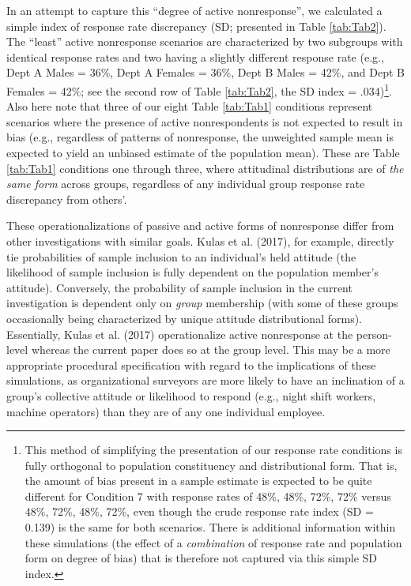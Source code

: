 \documentclass[
  man,mask]{apa7}
\begin{document}
In an attempt to capture this ``degree of active nonresponse'', we calculated a simple index of response rate discrepancy (SD; presented in Table \ref{tab:Tab2}). The ``least'' active nonresponse scenarios are characterized by two subgroups with identical response rates and two having a slightly different response rate (e.g., Dept A Males = 36\%, Dept A Females = 36\%, Dept B Males = 42\%, and Dept B Females = 42\%; see the second row of Table \ref{tab:Tab2}, the SD index = .034)\footnote{This method of simplifying the presentation of our response rate conditions is fully orthogonal to population constituency and distributional form. That is, the amount of bias present in a sample estimate is expected to be quite different for Condition 7 with response rates of 48\%, 48\%, 72\%, 72\% versus 48\%, 72\%, 48\%, 72\%, even though the crude response rate index (SD = 0.139) is the same for both scenarios. There is additional information within these simulations (the effect of a \emph{combination} of response rate and population form on degree of bias) that is therefore not captured via this simple SD index.}. Also here note that three of our eight Table \ref{tab:Tab1} conditions represent scenarios where the presence of active nonrespondents is not expected to result in bias (e.g., regardless of patterns of nonresponse, the unweighted sample mean is expected to yield an unbiased estimate of the population mean). These are Table \ref{tab:Tab1} conditions one through three, where attitudinal distributions are of \emph{the same form} across groups, regardless of any individual group response rate discrepancy from others'.

These operationalizations of passive and active forms of nonresponse differ from other investigations with similar goals. Kulas et al. (2017), for example, directly tie probabilities of sample inclusion to an individual's held attitude (the likelihood of sample inclusion is fully dependent on the population member's attitude). Conversely, the probability of sample inclusion in the current investigation is dependent only on \emph{group} membership (with some of these groups occasionally being characterized by unique attitude distributional forms). Essentially, Kulas et al. (2017) operationalize active nonresponse at the person-level whereas the current paper does so at the group level. This may be a more appropriate procedural specification with regard to the implications of these simulations, as organizational surveyors are more likely to have an inclination of a group's collective attitude or likelihood to respond (e.g., night shift workers, machine operators) than they are of any one individual employee.
\end{document}
